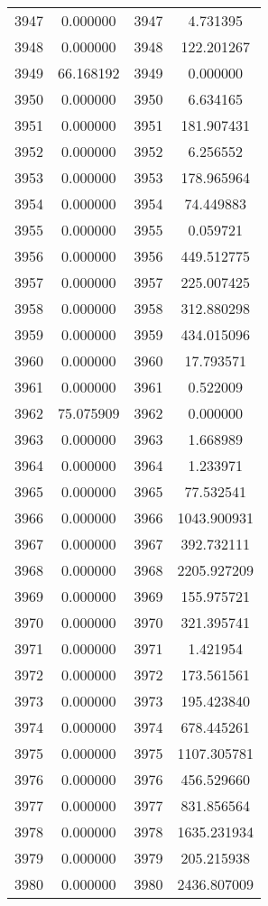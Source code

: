 \documentclass[12pt]{article}
\begin{document}
\begin{longtable}{@{}cccc@{}}
3947 & 0.000000 & 3947 & 4.731395 \\
3948 & 0.000000 & 3948 & 122.201267 \\
3949 & 66.168192 & 3949 & 0.000000 \\
3950 & 0.000000 & 3950 & 6.634165 \\
3951 & 0.000000 & 3951 & 181.907431 \\
3952 & 0.000000 & 3952 & 6.256552 \\
3953 & 0.000000 & 3953 & 178.965964 \\
3954 & 0.000000 & 3954 & 74.449883 \\
3955 & 0.000000 & 3955 & 0.059721 \\
3956 & 0.000000 & 3956 & 449.512775 \\
3957 & 0.000000 & 3957 & 225.007425 \\
3958 & 0.000000 & 3958 & 312.880298 \\
3959 & 0.000000 & 3959 & 434.015096 \\
3960 & 0.000000 & 3960 & 17.793571 \\
3961 & 0.000000 & 3961 & 0.522009 \\
3962 & 75.075909 & 3962 & 0.000000 \\
3963 & 0.000000 & 3963 & 1.668989 \\
3964 & 0.000000 & 3964 & 1.233971 \\
3965 & 0.000000 & 3965 & 77.532541 \\
3966 & 0.000000 & 3966 & 1043.900931 \\
3967 & 0.000000 & 3967 & 392.732111 \\
3968 & 0.000000 & 3968 & 2205.927209 \\
3969 & 0.000000 & 3969 & 155.975721 \\
3970 & 0.000000 & 3970 & 321.395741 \\
3971 & 0.000000 & 3971 & 1.421954 \\
3972 & 0.000000 & 3972 & 173.561561 \\
3973 & 0.000000 & 3973 & 195.423840 \\
3974 & 0.000000 & 3974 & 678.445261 \\
3975 & 0.000000 & 3975 & 1107.305781 \\
3976 & 0.000000 & 3976 & 456.529660 \\
3977 & 0.000000 & 3977 & 831.856564 \\
3978 & 0.000000 & 3978 & 1635.231934 \\
3979 & 0.000000 & 3979 & 205.215938 \\
3980 & 0.000000 & 3980 & 2436.807009 \\

\end{longtable}
\end{document}
